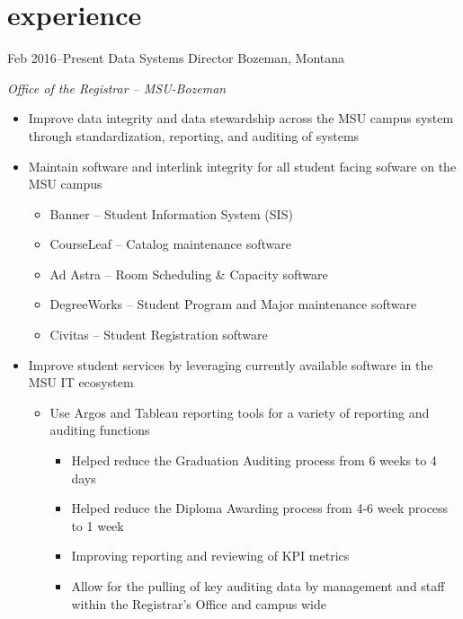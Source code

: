 \documentclass[]{two-column-stats} %
\begin{document}
\newpage
{}

\section{experience}

\begin{entrylist}
\entry
{Feb 2016--Present}
{Data Systems Director}
{Bozeman, Montana}
{\emph{Office of the Registrar -- MSU-Bozeman}
\begin{itemize}
  \item Improve data integrity and data stewardship across the MSU campus system through standardization, reporting, and auditing of systems
  \item Maintain software and interlink integrity for all student facing sofware on the MSU campus
  \begin{itemize}
    \item Banner -- Student Information System (SIS)
    \item CourseLeaf -- Catalog maintenance software
    \item Ad Astra -- Room Scheduling \& Capacity software
    \item DegreeWorks -- Student Program and Major maintenance software
    \item Civitas -- Student Registration software
  \end{itemize}
  \item Improve student services by leveraging currently available software in the MSU IT ecosystem
  \begin{itemize}
    \item Use Argos and Tableau reporting tools for a variety of reporting and auditing functions
    \begin{itemize}
      \item Helped reduce the Graduation Auditing process from 6 weeks to 4 days
      \item Helped reduce the Diploma Awarding process from 4-6 week process to 1 week
      \item Improving reporting and reviewing of KPI metrics
      \item Allow for the pulling of key auditing data by management and staff within the Registrar's Office and campus wide

\end{itemize}
\end{itemize}
\end{itemize}}
\end{entrylist}
\end{document}
